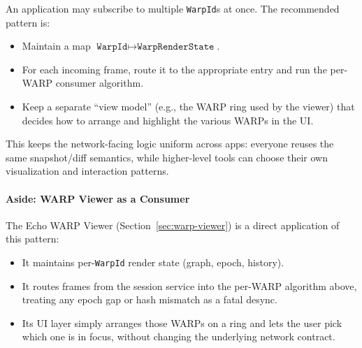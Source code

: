 An application may subscribe to multiple \texttt{WarpId}s at once. The
recommended pattern is:

\begin{itemize}
  \item Maintain a map \(\texttt{WarpId} \mapsto \texttt{WarpRenderState}\).
  \item For each incoming frame, route it to the appropriate entry and run the
        per-WARP consumer algorithm.
  \item Keep a separate ``view model'' (e.g., the WARP ring used by the viewer)
        that decides how to arrange and highlight the various WARPs in the UI.
\end{itemize}

This keeps the network-facing logic uniform across apps: everyone reuses the
same snapshot/diff semantics, while higher-level tools can choose their own
visualization and interaction patterns.

\paragraph{Aside: WARP Viewer as a Consumer}

The Echo WARP Viewer (Section~\ref{sec:warp-viewer}) is a direct application of
this pattern:
\begin{itemize}
  \item It maintains per-\texttt{WarpId} render state (graph, epoch, history).
  \item It routes frames from the session service into the per-WARP algorithm
        above, treating any epoch gap or hash mismatch as a fatal desync.
  \item Its UI layer simply arranges those WARPs on a ring and lets the user
        pick which one is in focus, without changing the underlying network
        contract.
\end{itemize}
